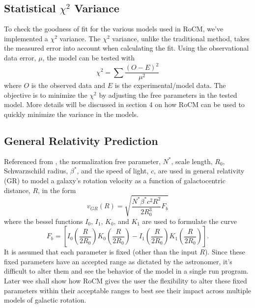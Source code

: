 \documentclass[conference]{IEEEtran-modified}
\begin{document}
\subsection{Statistical $\chi^2$ Variance}
To check the goodness of fit for the various models used in RoCM, we've implemented a $\chi^2$ variance. The $\chi^2$ variance, unlike the traditional method, takes the measured error into account when calculating the fit. Using the observational data error, $\mu$, the model can be tested with
\begin{equation}
\chi^2 = \sum \frac{(O-E)^2}{\mu^2}
\end{equation} 
where $O$ is the observed data and $E$ is the experimental/model data. The objective is to minimize the $\chi^2$ by adjusting the free parameters in the tested model.  More details will be discussed in section 4 on how RoCM can be used to quickly minimize the variance in the models.

\subsection{General Relativity Prediction}

Referenced from \cite{mannheim}, the normalization free parameter, $N^*$, scale length, $R_0$, Schwarzschild radius, $\beta^*$, and the speed of light, $c$, are used in general relativity (GR) to model a galaxy's rotation velocity as a function of galactocentric distance, $R$, in the form
\begin{equation}
v_{GR}(R) = \sqrt{\frac{N^*\beta^*c^2R^2}{2R^3_0}F_b}
\end{equation}
where the bessel functions $I_0$, $I_1$, $K_0$, and $K_1$ are used to formulate the curve
\begin{equation}
F_b = \left[I_0\left(\frac{R}{2R_0}\right)K_0\left(\frac{R}{2R_0}\right)-I_1\left(\frac{R}{2R_0}\right)K_1\left(\frac{R}{2R_0}\right)\right].
\end{equation}
It is assumed that each parameter is fixed (other than the input $R$). Since these fixed parameters have an accepted range as dictated by the astronomer, it's difficult to alter them and see the behavior of the model in a single run program.   Later wee shall show how RoCM gives the user the flexibility to alter these fixed parameters within their acceptable ranges to best see their impact across multiple models of galactic rotation. 
\end{document}
